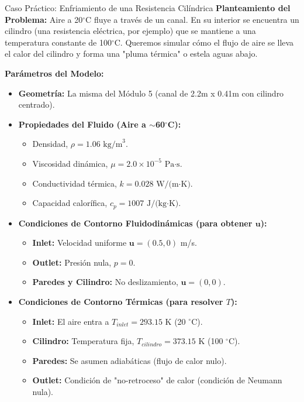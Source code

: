 \begin{examplebox}{Caso Práctico: Enfriamiento de una Resistencia Cilíndrica}
    \textbf{Planteamiento del Problema:} Aire a 20$^{\circ}$C fluye a través de un canal. En su interior se encuentra un cilindro (una resistencia eléctrica, por ejemplo) que se mantiene a una temperatura constante de 100$^{\circ}$C. Queremos simular cómo el flujo de aire se lleva el calor del cilindro y forma una "pluma térmica" o estela aguas abajo.
    
    \textbf{Parámetros del Modelo:}
    \begin{itemize}
        \item \textbf{Geometría:} La misma del Módulo 5 (canal de 2.2m x 0.41m con cilindro centrado).
        \item \textbf{Propiedades del Fluido (Aire a $\sim$60$^{\circ}$C):}
            \begin{itemize}
                \item Densidad, $\rho = 1.06 \text{ kg/m}^3$.
                \item Viscosidad dinámica, $\mu = 2.0 \times 10^{-5} \text{ Pa·s}$.
                \item Conductividad térmica, $k = 0.028 \text{ W/(m·K)}$.
                \item Capacidad calorífica, $c_p = 1007 \text{ J/(kg·K)}$.
            \end{itemize}
        \item \textbf{Condiciones de Contorno Fluidodinámicas (para obtener $\mathbf{u}$):}
             \begin{itemize}
                \item \textbf{Inlet:} Velocidad uniforme $\mathbf{u} = (0.5, 0)$ m/s.
                \item \textbf{Outlet:} Presión nula, $p=0$.
                \item \textbf{Paredes y Cilindro:} No deslizamiento, $\mathbf{u} = (0,0)$.
            \end{itemize}
        \item \textbf{Condiciones de Contorno Térmicas (para resolver $T$):}
             \begin{itemize}
                \item \textbf{Inlet:} El aire entra a $T_{inlet} = 293.15 \text{ K}$ (20 $^{\circ}$C).
                \item \textbf{Cilindro:} Temperatura fija, $T_{cilindro} = 373.15 \text{ K}$ (100 $^{\circ}$C).
                \item \textbf{Paredes:} Se asumen adiabáticas (flujo de calor nulo).
                \item \textbf{Outlet:} Condición de "no-retroceso" de calor (condición de Neumann nula).
            \end{itemize}
    \end{itemize}
\end{examplebox}

